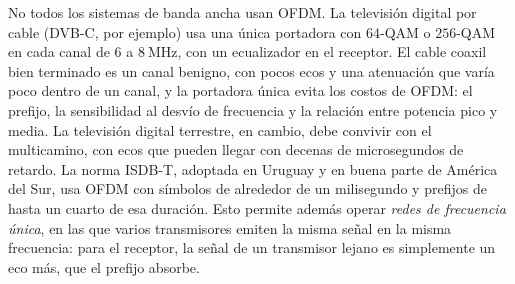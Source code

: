 No todos los sistemas de banda ancha usan OFDM. La televisión digital por cable (DVB-C, por ejemplo) usa una única portadora con $64$-QAM o $256$-QAM en cada canal de $6$ a $8\ \unit{\mega\hertz}$, con un ecualizador en el receptor. El cable coaxil bien terminado es un canal benigno, con pocos ecos y una atenuación que varía poco dentro de un canal, y la portadora única evita los costos de OFDM: el prefijo, la sensibilidad al desvío de frecuencia y la relación entre potencia pico y media. La televisión digital terrestre, en cambio, debe convivir con el multicamino, con ecos que pueden llegar con decenas de microsegundos de retardo. La norma ISDB-T, adoptada en Uruguay y en buena parte de América del Sur, usa OFDM con símbolos de alrededor de un milisegundo y prefijos de hasta un cuarto de esa duración. Esto permite además operar \emph{redes de frecuencia única}, en las que varios transmisores emiten la misma señal en la misma frecuencia: para el receptor, la señal de un transmisor lejano es simplemente un eco más, que el prefijo absorbe.
